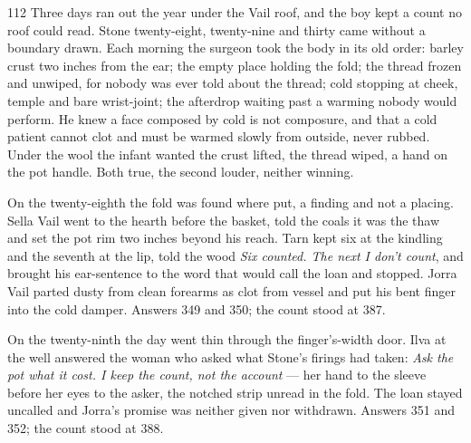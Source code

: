
\scenebreak


\scenebreak


\scenebreak

\CRtailpiece
\begin{CRchronicle}{112}
Three days ran out the year under the Vail roof, and the boy kept a count no roof could read. Stone twenty-eight, twenty-nine and thirty came without a boundary drawn. Each morning the surgeon took the body in its old order: barley crust two inches from the ear; the empty place holding the fold; the thread frozen and unwiped, for nobody was ever told about the thread; cold stopping at cheek, temple and bare wrist-joint; the afterdrop waiting past a warming nobody would perform. He knew a face composed by cold is not composure, and that a cold patient cannot clot and must be warmed slowly from outside, never rubbed. Under the wool the infant wanted the crust lifted, the thread wiped, a hand on the pot handle. Both true, the second louder, neither winning.

On the twenty-eighth the fold was found where put, a finding and not a placing. Sella Vail went to the hearth before the basket, told the coals it was the thaw and set the pot rim two inches beyond his reach. Tarn kept six at the kindling and the seventh at the lip, told the wood \emph{Six counted. The next I don’t count}, and brought his ear-sentence to the word that would call the loan and stopped. Jorra Vail parted dusty from clean forearms as clot from vessel and put his bent finger into the cold damper. Answers 349 and 350; the count stood at 387.

On the twenty-ninth the day went thin through the finger’s-width door. Ilva at the well answered the woman who asked what Stone’s firings had taken: \emph{Ask the pot what it cost. I keep the count, not the account} — her hand to the sleeve before her eyes to the asker, the notched strip unread in the fold. The loan stayed uncalled and Jorra’s promise was neither given nor withdrawn. Answers 351 and 352; the count stood at 388.


\end{CRchronicle}
